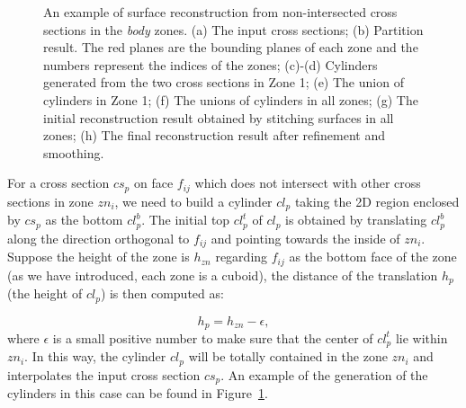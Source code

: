 \begin{figure} [htbp]
{\begin{minipage}[b]{0.22\textwidth}
    \end{minipage}}
  \caption{An example of surface reconstruction from non-intersected cross sections in the \textit{body} zones. (a) The input cross sections; (b) Partition result. The red planes are the bounding planes of each zone and the numbers represent the indices of the zones; (c)-(d) Cylinders generated from the two cross sections in Zone 1; (e) The union of cylinders in Zone 1; (f) The unions of cylinders in all zones; (g) The initial reconstruction result obtained by stitching surfaces in all zones; (h) The final reconstruction result after refinement and smoothing.}
  \label{fig:cshape} %
\end{figure}

For a cross section $cs_p$ on face $f_{ij}$ which does  not
intersect with other cross sections in zone $zn_i$, we need to build
a cylinder $cl_p$ taking the 2D region enclosed by $cs_p$ as the
bottom $cl_p^b$. The initial top $cl_p^t$ of $cl_p$ is obtained by
translating $cl_p^b$ along the direction orthogonal to $f_{ij}$ and
pointing towards the inside of $zn_i$. Suppose the height of the
zone is $h_{zn}$ regarding $f_{ij}$ as the bottom face of the zone
(as we have introduced, each zone is a cuboid), the distance of the
translation $h_p$ (the height of $cl_p$) is then computed as:

\begin{equation}
\label{eq:clheight}
h_p = h_{zn}- \epsilon,
\end{equation}
where $\epsilon$ is a small positive number to make sure  that the
center of $cl_p^t$ lie within $zn_i$. In this way, the cylinder
$cl_p$ will be totally contained in the zone $zn_i$ and interpolates
the input cross section $cs_p$. An example of the generation of the
cylinders in this case can be found in Figure~\ref{fig:cshape}.


